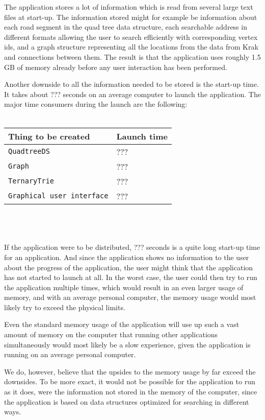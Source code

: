 The application stores a lot of information which is read from several large text files at start-up. The information stored might for example be information about each road segment in the quad tree data structure, each searchable address in different formats allowing the user to search efficiently with corresponding vertex ids, and a graph structure representing all the locations from the data from Krak and connections between them. The result is that the application uses roughly 1.5 GB of memory already before any user interaction has been performed.

Another downside to all the information needed to be stored is the start-up time. It takes about ??? seconds on an average computer to launch the application. The major time consumers during the launch are the following: \\ \\
\begin{tabular}{ p{5cm} | p{3cm} }
	\textbf{Thing to be created} & \textbf{Launch time} \\
	\hline
	\texttt{QuadtreeDS} & ??? \\
	\texttt{Graph} & ??? \\
	\texttt{TernaryTrie} & ??? \\
	\texttt{Graphical user interface} & ???
\end{tabular}
\\ \\ \\
If the application were to be distributed, ??? seconds is a quite long start-up time for an application. And since the application shows no information to the user about the progress of the application, the user might think that the application has not started to launch at all. In the worst case, the user could then try to run the application multiple times, which would result in an even larger usage of memory, and with an average personal computer, the memory usage would most likely try to exceed the physical limits.

Even the standard memory usage of the application will use up such a vast amount of memory on the computer that running other applications simultaneously would most likely be a slow experience, given the application is running on an average personal computer.

We do, however, believe that the upsides to the memory usage by far exceed the downsides. To be more exact, it would not be possible for the application to run as it does, were the information not stored in the memory of the computer, since the application is based on data structures optimized for searching in different ways.

